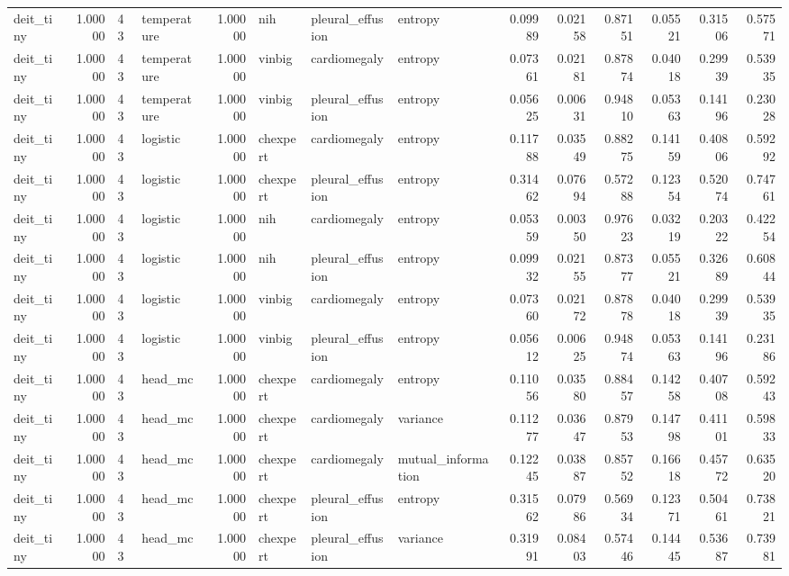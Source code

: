 \begin{tabular}{lrllrlllrrrrrr}
deit\_tiny & 1.00000 & 43 & temperature & 1.00000 & nih & pleural\_effusion & entropy & 0.09989 & 0.02158 & 0.87151 & 0.05521 & 0.31506 & 0.57571 \\
deit\_tiny & 1.00000 & 43 & temperature & 1.00000 & vinbig & cardiomegaly & entropy & 0.07361 & 0.02181 & 0.87874 & 0.04018 & 0.29939 & 0.53935 \\
deit\_tiny & 1.00000 & 43 & temperature & 1.00000 & vinbig & pleural\_effusion & entropy & 0.05625 & 0.00631 & 0.94810 & 0.05363 & 0.14196 & 0.23028 \\
deit\_tiny & 1.00000 & 43 & logistic & 1.00000 & chexpert & cardiomegaly & entropy & 0.11788 & 0.03549 & 0.88275 & 0.14159 & 0.40806 & 0.59292 \\
deit\_tiny & 1.00000 & 43 & logistic & 1.00000 & chexpert & pleural\_effusion & entropy & 0.31462 & 0.07694 & 0.57288 & 0.12354 & 0.52074 & 0.74761 \\
deit\_tiny & 1.00000 & 43 & logistic & 1.00000 & nih & cardiomegaly & entropy & 0.05359 & 0.00350 & 0.97623 & 0.03219 & 0.20322 & 0.42254 \\
deit\_tiny & 1.00000 & 43 & logistic & 1.00000 & nih & pleural\_effusion & entropy & 0.09932 & 0.02155 & 0.87377 & 0.05521 & 0.32689 & 0.60844 \\
deit\_tiny & 1.00000 & 43 & logistic & 1.00000 & vinbig & cardiomegaly & entropy & 0.07360 & 0.02172 & 0.87878 & 0.04018 & 0.29939 & 0.53935 \\
deit\_tiny & 1.00000 & 43 & logistic & 1.00000 & vinbig & pleural\_effusion & entropy & 0.05612 & 0.00625 & 0.94874 & 0.05363 & 0.14196 & 0.23186 \\
deit\_tiny & 1.00000 & 43 & head\_mc & 1.00000 & chexpert & cardiomegaly & entropy & 0.11056 & 0.03580 & 0.88457 & 0.14258 & 0.40708 & 0.59243 \\
deit\_tiny & 1.00000 & 43 & head\_mc & 1.00000 & chexpert & cardiomegaly & variance & 0.11277 & 0.03647 & 0.87953 & 0.14798 & 0.41101 & 0.59833 \\
deit\_tiny & 1.00000 & 43 & head\_mc & 1.00000 & chexpert & cardiomegaly & mutual\_information & 0.12245 & 0.03887 & 0.85752 & 0.16618 & 0.45772 & 0.63520 \\
deit\_tiny & 1.00000 & 43 & head\_mc & 1.00000 & chexpert & pleural\_effusion & entropy & 0.31562 & 0.07986 & 0.56934 & 0.12371 & 0.50461 & 0.73821 \\
deit\_tiny & 1.00000 & 43 & head\_mc & 1.00000 & chexpert & pleural\_effusion & variance & 0.31991 & 0.08403 & 0.57446 & 0.14445 & 0.53687 & 0.73981 \\

\end{tabular}
